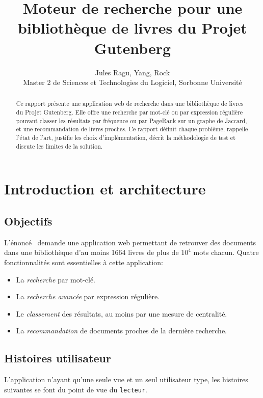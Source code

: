 \documentclass[11pt,a4paper]{article}
\title{\textbf{Moteur de recherche pour une bibliothèque de livres du Projet Gutenberg}}
\author{Jules Ragu, Yang, Rock\\
{\small Master 2 de Sciences et Technologies du Logiciel, Sorbonne Université}
}
\date{}
\begin{document}
\maketitle

\begin{abstract}
    \noindent Ce rapport présente une application web de recherche dans une bibliothèque de livres du Projet Gutenberg. Elle offre une recherche par mot-clé ou par expression régulière pouvant classer les résultats par fréquence ou par PageRank sur un graphe de Jaccard, et une recommandation de livres proches. Ce rapport définit chaque problème, rappelle l'état de l'art, justifie les choix d'implémentation, décrit la méthodologie de test et discute les limites de la solution.
\end{abstract}

\section{Introduction et architecture}

\subsection{Objectifs}

L'énoncé~\cite{enonce} demande une application web permettant de retrouver des documents dans une bibliothèque d'au moins 1664 livres de plus de $10^4$ mots chacun. Quatre fonctionnalités sont essentielles à cette application:
\begin{itemize}
    \item La \emph{recherche} par mot-clé.
    \item La \emph{recherche avancée} par expression régulière.
    \item Le \emph{classement} des résultats, au moins par une mesure de centralité.
    \item La \emph{recommandation} de documents proches de la dernière recherche.
\end{itemize}

\subsection{Histoires utilisateur}

L'application n'ayant qu'une seule vue et un seul utilisateur type, les histoires suivantes se font du point de vue du \texttt{lecteur}.
\end{document}
